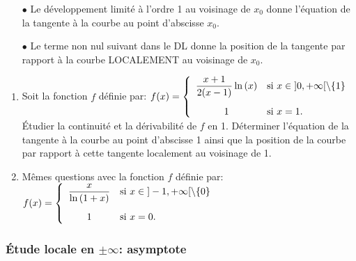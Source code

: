 \documentclass[a4paper, 11pt]{article}
\begin{document}
{{\begin{itemize}
\item[$\bullet$] Le d\'eveloppement limit\'e \`a l'ordre 1 au voisinage de $x_0$ donne
l'\'equation de la tangente \`a la courbe au point d'abscisse $x_0$.
\item[$\bullet$] Le terme non nul suivant dans le DL donne
la position de la tangente par rapport \`a la courbe LOCALEMENT au voisinage de $x_0$.
\end{itemize}
 }
\setlength\fboxrule{0.5pt}

{\footnotesize \begin{exercice} 
\begin{enumerate}
\item Soit la fonction $f$ d\'efinie par: $f(x)=\left\lbrace\begin{array}{cl}
 \ddp\frac{x+1}{2(x-1)}\ln{(x)} & \hbox{si}\ x\in \; \rbrack 0,+\infty\lbrack\setminus\lbrace 1\rbrace\vsec\\
 1 & \hbox{si}\ x=1.
 \end{array}\right.$\\
\'Etudier la continuit\'e et la d\'erivabilit\'e de $f$ en 1. D\'eterminer l'\'equation de la tangente \`a la courbe au point d'abscisse 1 ainsi que la position de la courbe par rapport \`a cette tangente localement au voisinage de 1.\vsec
\item  M\^{e}mes questions avec la fonction $f$ d\'efinie par:\
\noindent $f(x)=\left\lbrace\begin{array}{cl}
 \ddp\frac{x}{\ln{(1+x)}} & \hbox{si}\ x\in \; \rbrack -1,+\infty\lbrack\setminus\lbrace 0\rbrace\vsec\\
 1 & \hbox{si}\ x=0.
 \end{array}\right.$
\end{enumerate}
\end{exercice}}


\subsubsection{\'Etude locale en $\pm\infty$: asymptote}


\setlength\fboxrule{1pt}
\setlength\fboxrule{0.5pt}


}
\end{document}
